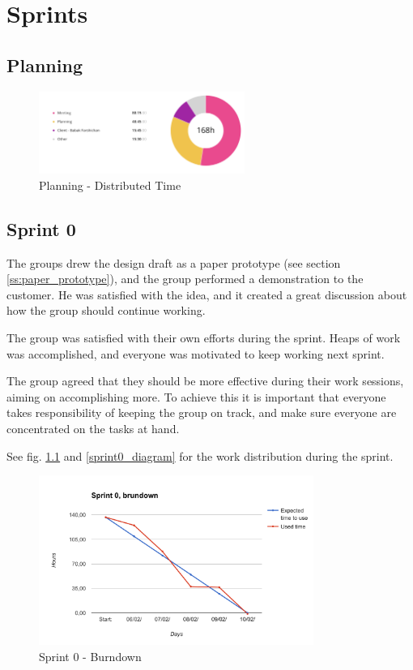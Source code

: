 \chapter{Sprints}
\label{Sprints}

\section{Planning}
\begin{figure}[t]
\centering
    \includegraphics[width=0.6\textwidth]{fig/planning-and-research-diagram}
\caption{Planning - Distributed Time}
\end{figure}

\section{Sprint 0}
The groups drew the design draft as a paper prototype (see section \ref{ss:paper_prototype}), and the group performed a demonstration to the customer. He was satisfied with the idea, and it created a great discussion about how the group should continue working.

The group was satisfied with their own efforts during the sprint. Heaps of work was accomplished, and everyone was motivated to keep working next sprint.
    
The group agreed that they should be more effective during their work sessions, aiming on accomplishing more. To achieve this it is important that everyone takes responsibility of keeping the group on track, and  make sure everyone are concentrated on the tasks at hand.

See fig. \ref{sprint0_burndown} and \ref{sprint0_diagram} for the work distribution during the sprint.

\begin{figure}[ht]
\centering
    \includegraphics[width=0.8\textwidth]{fig/sprint0}
\caption{Sprint 0 - Burndown} 
\label{sprint0_burndown}
\end{figure}

